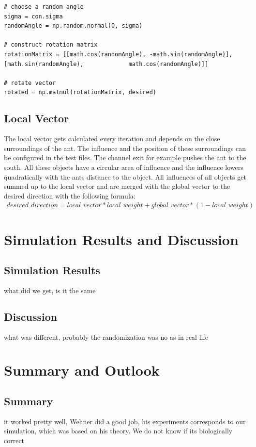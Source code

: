 \documentclass[11pt]{article}
\begin{document}
		
		
\begin{lstlisting}[caption={Randomization of desired step},label=lst:randomization]
# choose a random angle
sigma = con.sigma
randomAngle = np.random.normal(0, sigma)

# construct rotation matrix
rotationMatrix = [[math.cos(randomAngle), -math.sin(randomAngle)], [math.sin(randomAngle), 			   math.cos(randomAngle)]]

# rotate vector
rotated = np.matmul(rotationMatrix, desired)
\end{lstlisting}

	\subsection{Local Vector}
		The local vector gets calculated every iteration and depends on the close surroundings of the ant. The influence and the position of these surroundings can be configured in the test files. The channel exit for example pushes the ant to the south. All these objects have a circular area of influence and the influence lowers quadratically with the ants distance to the object. All influences of all objects get summed up to the local vector and are merged with the global vector to the desired direction with the following formula:
		\begin{align*}
			desired\_direction = local\_vector * local\_weight + global\_vector * (1-local\_weight)
		\end{align*}
\section{Simulation Results and Discussion}
	\subsection{Simulation Results} %
		what did we get, is it the same
	\subsection{Discussion}
		what was different, probably the randomization was no as in real life
\section{Summary and Outlook} %
	\subsection{Summary}
		it worked pretty well, Wehner did a good job, his experiments corresponds to our simulation, which was based on his theory. We do not know if its biologically correct
\end{document}
